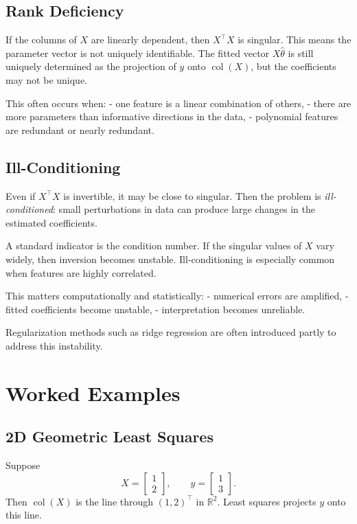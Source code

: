\subsection{Rank Deficiency}

If the columns of $X$ are linearly dependent, then $X^\top X$ is singular. This means the parameter vector is not uniquely identifiable. The fitted vector $X\hat\theta$ is still uniquely determined as the projection of $y$ onto $\operatorname{col}(X)$, but the coefficients may not be unique.

This often occurs when:
- one feature is a linear combination of others,
- there are more parameters than informative directions in the data,
- polynomial features are redundant or nearly redundant.

\subsection{Ill-Conditioning}

Even if $X^\top X$ is invertible, it may be close to singular. Then the problem is \emph{ill-conditioned}: small perturbations in data can produce large changes in the estimated coefficients.

A standard indicator is the condition number. If the singular values of $X$ vary widely, then inversion becomes unstable. Ill-conditioning is especially common when features are highly correlated.

This matters computationally and statistically:
- numerical errors are amplified,
- fitted coefficients become unstable,
- interpretation becomes unreliable.

Regularization methods such as ridge regression are often introduced partly to address this instability.

\section{Worked Examples}

\subsection{2D Geometric Least Squares}

Suppose
\[
X=
\begin{bmatrix}
1\\
2
\end{bmatrix},
\qquad
y=
\begin{bmatrix}
1\\
3
\end{bmatrix}.
\]
Then $\operatorname{col}(X)$ is the line through $(1,2)^\top$ in $\mathbb R^2$. Least squares projects $y$ onto this line.

